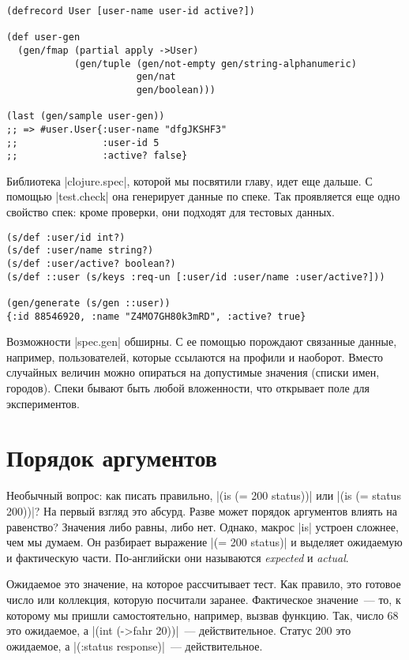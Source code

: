 \begin{verbatim}
(defrecord User [user-name user-id active?])

(def user-gen
  (gen/fmap (partial apply ->User)
            (gen/tuple (gen/not-empty gen/string-alphanumeric)
                       gen/nat
                       gen/boolean)))

(last (gen/sample user-gen))
;; => #user.User{:user-name "dfgJKSHF3"
;;               :user-id 5
;;               :active? false}
\end{verbatim}

Библиотека \spverb|clojure.spec|, которой мы посвятили главу, идет еще дальше. С
помощью \spverb|test.check| она генерирует данные по спеке. Так проявляется еще одно
свойство спек: кроме проверки, они подходят для тестовых данных.

\begin{verbatim}
(s/def :user/id int?)
(s/def :user/name string?)
(s/def :user/active? boolean?)
(s/def ::user (s/keys :req-un [:user/id :user/name :user/active?]))

(gen/generate (s/gen ::user))
{:id 88546920, :name "Z4MO7GH80k3mRD", :active? true}
\end{verbatim}

Возможности \spverb|spec.gen| обширны. С ее помощью порождают связанные данные,
например, пользователей, которые ссылаются на профили и наоборот. Вместо
случайных величин можно опираться на допустимые значения (списки имен,
городов). Спеки бывают быть любой вложенности, что открывает поле для
экспериментов.


\section{Порядок аргументов}

Необычный вопрос: как писать правильно, \spverb|(is (= 200 status))| или
\spverb|(is (= status 200))|? На первый взгляд это абсурд. Разве может порядок
аргументов влиять на равенство? Значения либо равны, либо нет. Однако, макрос
\spverb|is| устроен сложнее, чем мы думаем. Он разбирает выражение \spverb|(= 200 status)|
и выделяет ожидаемую и фактическую части. По-английски они
называются \emph{expected} и \emph{actual}.

Ожидаемое это значение, на которое рассчитывает тест. Как правило, это готовое
число или коллекция, которую посчитали заранее. Фактическое значение~--- то, к
которому мы пришли самостоятельно, например, вызвав функцию. Так, число 68 это
ожидаемое, а \spverb|(int (->fahr 20))|~--- действительное. Статус 200 это ожидаемое, а
\spverb|(:status response)|~--- действительное.

